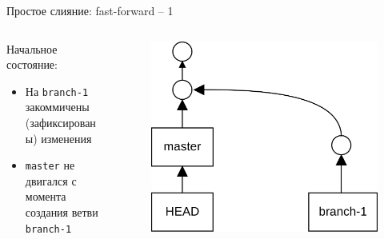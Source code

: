 \documentclass[presentation]{beamer}
\begin{document}
\begin{frame}[fragile]{Простое слияние: fast-forward -- 1}
  \begin{columns}
    \begin{column}{.4\textwidth}
      Начальное состояние:
      \begin{itemize}
      \item На \texttt{branch-1} закоммичены (зафиксированы) изменения
      \item \texttt{master} не двигался с момента создания ветви
        \texttt{branch-1}
      \end{itemize}
      \end{column}
      \begin{column}{.6\textwidth}
        \begin{figure}[htb]
          \centering
          \includegraphics[height=.6\textheight]{git-operation-merge-1-1}
        \end{figure}
      \end{column}
    \end{columns}
\end{frame}
\end{document}
